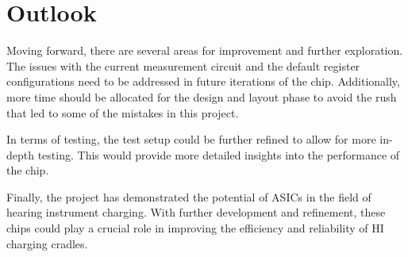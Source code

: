 \section{Outlook}
\label{chap:outlook}
Moving forward, there are several areas for improvement and further exploration. The issues with the current measurement circuit and the default register configurations need to be addressed in future iterations of the chip. Additionally, more time should be allocated for the design and layout phase to avoid the rush that led to some of the mistakes in this project.

In terms of testing, the test setup could be further refined to allow for more in-depth testing. This would provide more detailed insights into the performance of the chip.

Finally, the project has demonstrated the potential of ASICs in the field of hearing instrument charging. With further development and refinement, these chips could play a crucial role in improving the efficiency and reliability of HI charging cradles.
\clearpage